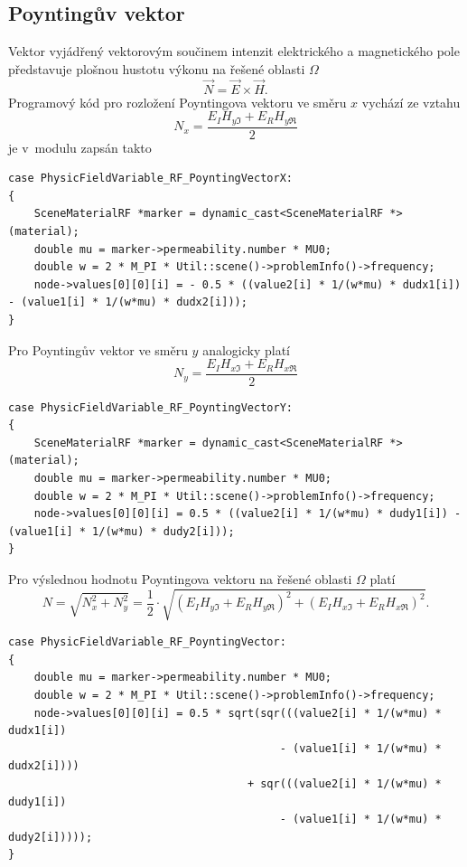 \subsection*{Poyntingův vektor}
Vektor vyjádřený vektorovým součinem intenzit elektrického a magnetického pole představuje plošnou hustotu výkonu na řešené oblasti $\Omega$
\begin{displaymath}
	\vec N = \vec E \times\vec H.
\end{displaymath}
Programový kód pro rozložení Poyntingova vektoru ve směru $x$ vychází ze vztahu
\begin{displaymath}
	N_x = \frac{E_I H_{y\Im} + E_R H_{y\Re}}{2}
\end{displaymath}
je v~modulu zapsán takto
\begin{verbatim}
case PhysicFieldVariable_RF_PoyntingVectorX:
{
    SceneMaterialRF *marker = dynamic_cast<SceneMaterialRF *>(material);
    double mu = marker->permeability.number * MU0;
    double w = 2 * M_PI * Util::scene()->problemInfo()->frequency;
    node->values[0][0][i] = - 0.5 * ((value2[i] * 1/(w*mu) * dudx1[i]) - (value1[i] * 1/(w*mu) * dudx2[i]));
}
\end{verbatim}
Pro Poyntingův vektor ve směru $y$ analogicky platí
\begin{displaymath}
	N_y = \frac{E_I H_{x\Im} + E_R H_{x\Re}}{2}
\end{displaymath}
\begin{verbatim}
case PhysicFieldVariable_RF_PoyntingVectorY:
{
    SceneMaterialRF *marker = dynamic_cast<SceneMaterialRF *>(material);
    double mu = marker->permeability.number * MU0;
    double w = 2 * M_PI * Util::scene()->problemInfo()->frequency;
    node->values[0][0][i] = 0.5 * ((value2[i] * 1/(w*mu) * dudy1[i]) - (value1[i] * 1/(w*mu) * dudy2[i]));
}
\end{verbatim}
Pro výslednou hodnotu Poyntingova vektoru na řešené oblasti $\Omega$ platí
\begin{displaymath}
	N = \sqrt{N_{x}^{2} + N_{y}^{2}} = \frac{1}{2}\cdot\sqrt{(E_I H_{y\Im} + E_R H_{y\Re})^{2} + (E_I H_{x\Im} + E_R H_{x\Re})^{2}}.
\end{displaymath}
\begin{verbatim}
case PhysicFieldVariable_RF_PoyntingVector:
{
    double mu = marker->permeability.number * MU0;
    double w = 2 * M_PI * Util::scene()->problemInfo()->frequency;
    node->values[0][0][i] = 0.5 * sqrt(sqr(((value2[i] * 1/(w*mu) * dudx1[i]) 
                                          - (value1[i] * 1/(w*mu) * dudx2[i]))) 
                                     + sqr(((value2[i] * 1/(w*mu) * dudy1[i]) 
                                          - (value1[i] * 1/(w*mu) * dudy2[i]))));
}
\end{verbatim}

